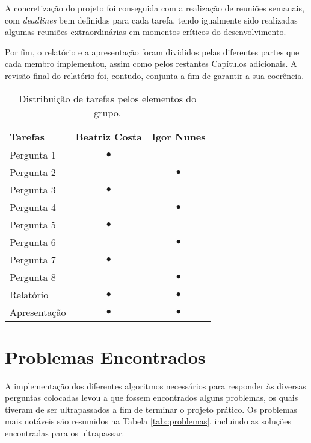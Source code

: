 A concretização do projeto foi conseguida com a realização de reuniões semanais, com \textit{deadlines} bem definidas para cada tarefa, tendo igualmente sido realizadas algumas reuniões extraordinárias em momentos críticos do desenvolvimento.

Por fim, o relatório e a apresentação foram divididos pelas diferentes partes que cada membro implementou, assim como pelos restantes Capítulos adicionais. A revisão final do relatório foi, contudo, conjunta a fim de garantir a sua coerência.

\begin{table}[!htbp]
	\centering
	\begin{tabular}{l c c}
		\toprule
		\textbf{Tarefas} & \textbf{Beatriz Costa} & \textbf{Igor Nunes}\\
		\midrule
		Pergunta 1      &   $\bullet$   &               \\
        Pergunta 2      &               &   $\bullet$   \\
        Pergunta 3      &   $\bullet$   &               \\
        Pergunta 4      &               &   $\bullet$   \\
        Pergunta 5      &   $\bullet$   &               \\
        Pergunta 6      &               &   $\bullet$   \\
        Pergunta 7      &   $\bullet$   &               \\
        Pergunta 8      &               &   $\bullet$   \\
        Relatório       &   $\bullet$   &   $\bullet$   \\
        Apresentação    &   $\bullet$   &   $\bullet$   \\
		\bottomrule
	\end{tabular}
	\caption[Distribuição de tarefas]{Distribuição de tarefas pelos elementos do grupo.}
	\label{tab::divisao-trabalho}
\end{table}


\section{Problemas Encontrados}
\label{sec::reflexao:problemas}

A implementação dos diferentes algoritmos necessários para responder às diversas perguntas colocadas levou a que fossem encontrados alguns problemas, os quais tiveram de ser ultrapassados a fim de terminar o projeto prático. Os problemas mais notáveis são resumidos na Tabela \ref{tab::problemas}, incluindo as soluções encontradas para os ultrapassar.

